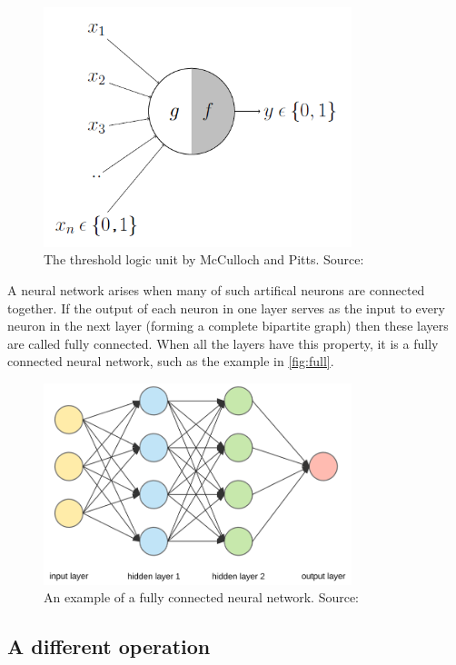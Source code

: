 \begin{figure}
    \centering
    \includegraphics[width=0.8\textwidth]{images/mp.png}
    \caption{The threshold logic unit by McCulloch and Pitts. Source: \cite{med}}
    \label{fig:mp}
\end{figure}

A neural network arises when many of such artifical neurons are connected together. If the output of each neuron in one layer serves as the input to every neuron in the next layer (forming a complete bipartite graph) then these layers are called fully connected. When all the layers have this property, it is a fully connected neural network, such as the example in \autoref{fig:full}.\\

\begin{figure}
    \centering
    \includegraphics[width=0.8\textwidth]{images/fullyNet.png}
    \caption{An example of a fully connected neural network. Source: \cite{fullpic}}
    \label{fig:full}
\end{figure}

\subsection{A different operation}

